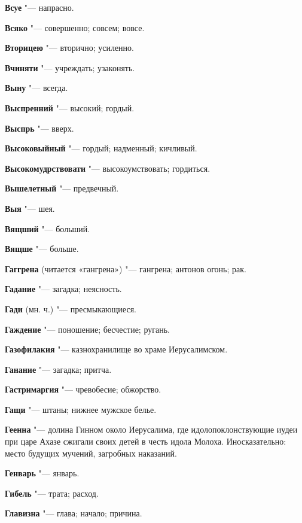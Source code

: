 \begin{mymulticols}
\noindent\textbf{Всуе} "--- напрасно. 

\noindent\textbf{Всяко} "--- совершенно; совсем; вовсе. 

\noindent\textbf{Вторицею} "--- вторично; усиленно. 

\noindent\textbf{Вчиняти} "--- учреждать; узаконять. 

\noindent\textbf{Выну} "--- всегда. 

\noindent\textbf{Выспренний} "--- высокий; гордый. 

\noindent\textbf{Выспрь} "--- вверх. 

\noindent\textbf{Высоковыйный} "--- гордый; надменный; кичливый. 

\noindent\textbf{Высокомудрствовати} "--- высокоумствовать; гордиться. 

\noindent\textbf{Вышелетный} "--- предвечный. 

\noindent\textbf{Выя} "--- шея. 

\noindent\textbf{Вящший} "--- больший. 

\noindent\textbf{Вящше} "--- больше. 

\bukvaending


\noindent\textbf{Гаггрена} (читается «гангрена») "--- гангрена; антонов огонь; рак. 

\noindent\textbf{Гадание} "--- загадка; неясность. 

\noindent\textbf{Гади} (мн. ч.) "--- пресмыкающиеся. 

\noindent\textbf{Гаждение} "--- поношение; бесчестие; ругань. 

\noindent\textbf{Газофилакия} "--- казнохранилище во храме Иерусалимском. 

\noindent\textbf{Ганание} "--- загадка; притча. 

\noindent\textbf{Гастримаргия} "--- чревобесие; обжорство. 

\noindent\textbf{Гащи} "--- штаны; нижнее мужское белье. 

\noindent\textbf{Геенна} "--- долина Гинном около Иерусалима, где идолопоклонствующие иудеи при царе Ахазе сжигали своих детей в честь идола Молоха. Иносказательно: место будущих мучений, загробных наказаний. 

\noindent\textbf{Генварь} "--- январь. 

\noindent\textbf{Гибель} "--- трата; расход. 

\noindent\textbf{Главизна} "--- глава; начало; причина. 


\end{mymulticols}
